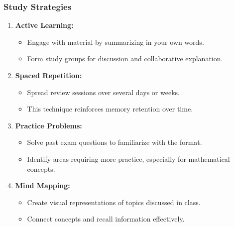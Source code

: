 \documentclass[aspectratio=169]{beamer}
\begin{document}
\begin{frame}[fragile]
    \frametitle{Study Strategies}
    
    \begin{enumerate}
        \item \textbf{Active Learning:}
            \begin{itemize}
                \item Engage with material by summarizing in your own words.
                \item Form study groups for discussion and collaborative explanation.
            \end{itemize}
        
        \item \textbf{Spaced Repetition:}
            \begin{itemize}
                \item Spread review sessions over several days or weeks.
                \item This technique reinforces memory retention over time.
            \end{itemize}
        
        \item \textbf{Practice Problems:}
            \begin{itemize}
                \item Solve past exam questions to familiarize with the format.
                \item Identify areas requiring more practice, especially for mathematical concepts.
            \end{itemize}
        
        \item \textbf{Mind Mapping:}
            \begin{itemize}
                \item Create visual representations of topics discussed in class.
                \item Connect concepts and recall information effectively.
            \end{itemize}
    \end{enumerate}
\end{frame}
\end{document}
